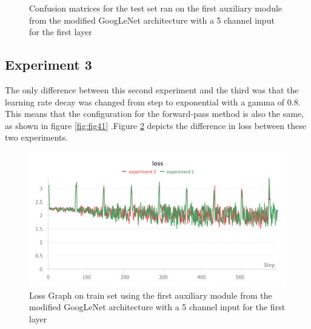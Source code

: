 \begin{figure}[!ht]
    \caption{Confusion matrices for the test set ran on the first auxiliary module from the modified GoogLeNet architecture with a 5 channel input for the first layer}
    \label{fig:fig11}
\end{figure}

\subsection{Experiment 3}

The only difference between this second experiment and the third was that the learning rate decay was changed from step to exponential with a gamma of 0.8. This means that the configuration for the forward-pass method is also the same, as shown in figure \ref{fig:fig41} .Figure \ref{fig:fig13} depicts the difference in loss between these two experiments.

\begin{figure}[!ht]
    \centering
    \includegraphics[width=1\textwidth]{figures/Figure14.png}
    \caption{Loss Graph on train set using the first auxiliary module from the modified GoogLeNet architecture with a 5 channel input for the first layer}
    \label{fig:fig13}
\end{figure}

